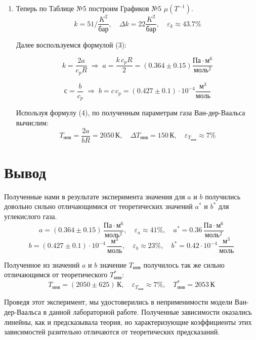 \documentclass[a4paper,12pt]{article}
\begin{document}
\begin{enumerate}
	
		\item Теперь по Таблице №5 построим Графиков №5 $\mu(T^{-1})$.
		$$k = 51/ \frac{K^2}{бар},\quad \Delta k = 22 \frac{K^2}{бар},\quad \varepsilon_{k} \approx 43.7\%$$
		
		
		Далее воспользуемся формулой (3):
		
		$$k = \dfrac{2a}{c_pR} \; \Rightarrow \; a = \dfrac{k \, c_pR}{2} = (0.364\pm0.15) \frac{Па\cdot м^6}{моль^2}$$
		
		$$с = \dfrac{b}{c_p} \; \Rightarrow \; b = c \, c_p = (0.427\pm0.1)\cdot10^{-4} \frac{м^3}{моль}$$
		
		Используя формулу (4), по полученным параметрам газа Ван-дер-Ваальса вычислим: 
		$$T_{инв} = \dfrac{2a}{bR} = 2050 \, К, \quad \Delta T_{инв} =  150 \, К, \quad \varepsilon_{T_{инв}} \approx 7\%$$

\end{enumerate}

\newpage 

\section{Вывод}
	Полученные нами в результате эксперимента значения для $a$ и $b$ получились довольно сильно отличающимися от теоретических значений $a^*$ и $b^*$ для углекислого газа.
	$$a = (0.364\pm0.15) \, \frac{Па\cdot м^6}{моль^2}, \quad \varepsilon_{a} \approx 41\%, \quad a^* = 0.36 \, \frac{Па\cdot м^6}{моль^2}$$
	$$b = (0.427\pm0.1)\cdot10^{-4} \, \frac{м^3}{моль}, \quad \varepsilon_{b} \approx 23\%, \quad b^* = 0.42\cdot 10^{-4} \, \frac{м^3}{моль}$$
	
	Полученное из значений $a$ и $b$ значение $T_{инв}$ получилось так же сильно отличающимся от теоретического $T_{инв}^*$:
	$$T_{инв} = (2050\pm625) \, К, \quad \varepsilon_{T_{инв}} \approx 7\%, \quad T_{инв}^* = 2053 \, К$$
	
	Проведя этот эксперимент, мы удостоверились в неприменимости модели Ван-дер-Ваальса в данной лабораторной работе. Полученные зависимости оказались линейны, как и предсказывала теория, но характеризующие коэффициенты этих зависимостей разительно отличаются от теоретических предсказаний. \\
	
\end{document}
